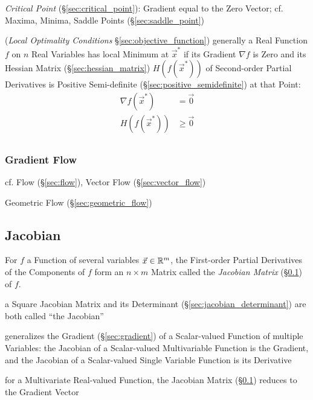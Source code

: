 \emph{Critical Point} (\S\ref{sec:critical_point}): Gradient equal to the Zero
Vector; cf. Maxima, Minima, Saddle Points (\S\ref{sec:saddle_point})

(\emph{Local Optimality Conditions} \S\ref{sec:objective_function}) generally a
Real Function $f$ on $n$ Real Variables has local Minimum at $\vec{x}^*$ if its
Gradient $\nabla f$ is Zero and its Hessian Matrix (\S\ref{sec:hessian_matrix})
$H(f(\vec{x}^*))$ of Second-order Partial Derivatives is Positive Semi-definite
(\S\ref{sec:positive_semidefinite}) at that Point:
\begin{align*}
  \nabla f(\vec{x}^*) & =    \vec{0} \\
  H(f(\vec{x}^*))     & \geq \vec{0} \\
\end{align*}



\subsubsection{Gradient Flow}\label{sec:gradient_flow}

cf. Flow (\S\ref{sec:flow}), Vector Flow (\S\ref{sec:vector_flow})

Geometric Flow (\S\ref{sec:geometric_flow})



\subsection{Jacobian}\label{sec:jacobian}

For $f$ a Function of several variables $\vec{x} \in \mathbb{R}^m$, the First-order
Partial Derivatives of the Components of $f$ form an $n \times m$ Matrix called
the \emph{Jacobian Matrix} (\S\ref{sec:jacobian}) of $f$.

a Square Jacobian Matrix and its Determinant (\S\ref{sec:jacobian_determinant})
are both called ``the Jacobian''

generalizes the Gradient (\S\ref{sec:gradient}) of a Scalar-valued Function of
multiple Variables: the Jacobian of a Scalar-valued Multivariable Function is
the Gradient, and the Jacobian of a Scalar-valued Single Variable Function is
its Derivative

for a Multivariate Real-valued Function, the Jacobian Matrix
(\S\ref{sec:jacobian}) reduces to the Gradient Vector

